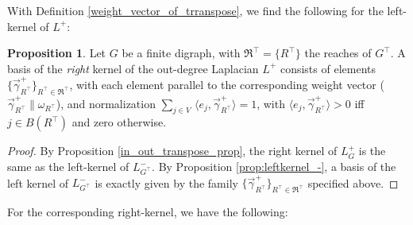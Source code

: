 \documentclass[reqno,12pt,letterpaper]{amsart}
\numberwithin{equation}{section}
\newcommand{\Lin}{L^{-}}
\newcommand{\Lout}{L^{+}}
\newcommand{\1}{\mathds{1}}
\theoremstyle{definition}
\newtheorem{prop}{Proposition}[section]
\begin{document}
With Definition \ref{weight_vector_of_trranspose},  we find the following for the left-kernel of $\Lout$:



\begin{prop}\label{right_kernel_+}
	Let $G$ be a finite digraph, with  $ \mathfrak{R}^{\intercal} = \{R^\intercal\}$ the reaches of $G^\intercal$.  
	A basis of the \emph{right} kernel of the out-degree Laplacian $\Lout$ consists of elements $\{\vec\gamma^{+}_{R^\intercal}\}_{R^\intercal \in \mathfrak{R}^\intercal}$, with each element  parallel to the corresponding weight vector ($\vec\gamma^{+}_{R^\intercal} \parallel \omega_{R^\intercal}$), and
	  normalization	$\sum_{j \in V}\, \langle e_j, \vec\gamma^{+}_{R^\intercal}\rangle =1$, with 	$\langle e_j,	\vec	\gamma^{+}_{R^\intercal}\rangle >0$ iff $ j\in B(R^\intercal)$ and zero otherwise.
	\end{prop}

	\begin{proof}
By Proposition \ref{in_out_transpose_prop}, the right kernel of $\Lout_G$ is the same as the left-kernel of $\Lin_{G^\intercal}$. By Proposition \ref{prop:leftkernel_-}, a basis of the left kernel of $\Lin_{G^\intercal}$ is exactly given by the family $\{\vec\gamma^{+}_{R^\intercal}\}_{R^\intercal \in \mathfrak{R}^\intercal}$ specified above.
	\end{proof}
	
For the corresponding right-kernel, we have the following:
\end{document}
